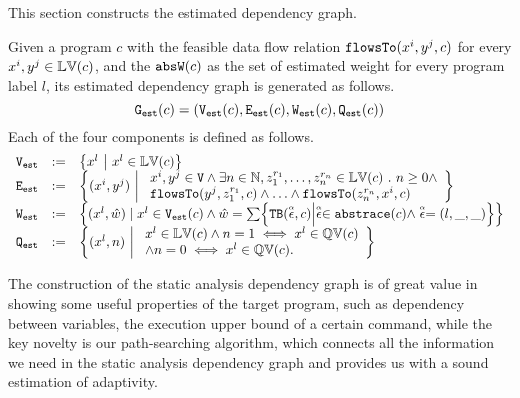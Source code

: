 This section constructs the estimated dependency graph.
\begin{defn}
\label{def:prog_graph}
Given a program $c$ 
with the feasible data flow relation $\mathtt{flowsTo}(x^i, y^j, c)$ for every $x^i, y^j \in \mathbb{LV}(c)$, 
and the $\mathtt{abs}{\mathtt{W}}(c)$ as the set of estimated weight for every program label $l$,
its estimated dependency graph
is generated as follows.
\[\mathtt{{G_{est}}}(c) = (\mathtt{{V_{est}}}(c), \mathtt{{E_{est}}}(c), \mathtt{{W_{est}}}(c), \mathtt{{Q_{est}}}(c))\]
Each of the four components is defined as follows.
{\small
\[
\begin{array}{lll}
\progV & := & \left\{ 
x^l
~ \middle\vert ~
x^l \in \lvar(c)
\right\}
\\
\progE & := & 
\left\{ 
(x^i, y^j) 
~ \middle\vert ~
\begin{array}{l}
x^i, y^j \in \vertxs
\land
\exists n \in \mathbb{N}, z_1^{r_1}, \ldots, z_n^{r_n} \in \lvar(c) \st
n \geq 0 \land
\\
\flowsto(y^j, z_1^{r_1}, c) 
\land \ldots \land \flowsto(z_n^{r_n}, x^i, c) 
\end{array}
\right\}
\\
\progW & := &
\left\{ (x^l, \hat{w}) 
\mid
x^l \in \progV(c) \land 
\hat{w} = 
\sum\left\{ \absclr(\absevent, c) \middle\vert \absevent \in \absflow(c) \land \absevent = (l, \_, \_) \right\}
\right\}
\\
\progF & := & 
\left\{(x^l, n) 
~ \middle\vert ~
\begin{array}{l}
 x^l \in \lvar(c) \land
 n = 1 \iff x^l \in \qvar(c) \\
\land n = 0 \iff x^l \in \qvar(c) .
\end{array}
\right\}
\end{array}
\] }
\end{defn}
The construction of the static analysis dependency graph is of great value in showing some useful properties of the target program,
such as dependency between variables, the execution upper bound of a certain command,
while the key novelty is our path-searching algorithm, which connects all the information we need in the static analysis dependency graph and provides us with a sound estimation of adaptivity.


